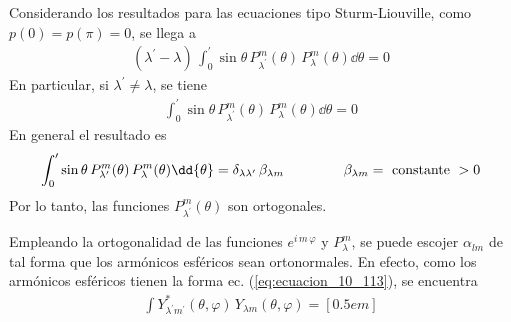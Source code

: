 Considerando los resultados para las ecuaciones tipo Sturm-Liouville, como $p(0) = p(\pi) = 0$, se llega a
\begin{align*}
(\lambda^{\prime} - \lambda) \, \int_{0}^{\prime} \sin \theta \, P_{\lambda^{\prime}}^{m} (\theta) \, P_{\lambda}^{m} (\theta) \dd{\theta} = 0
\end{align*}
En particular, si $\lambda^{\prime} \neq \lambda$, se tiene
\begin{align}
\int_{0}^{\prime} \sin \theta \, P_{\lambda^{\prime}}^{m} (\theta) \, P_{\lambda}^{m} (\theta) \dd{\theta} = 0
\label{eq:ecuacion_10_123}
\end{align}
En general el resultado es
\begin{align}
\int_{0}^{\prime} \sin \theta \, P_{\lambda^{\prime}}^{m} (\theta) \, P_{\lambda}^{m} (\theta) \dd{\theta} = \delta_{\lambda \lambda^{\prime}} \, \beta_{\lambda m} \hspace{1.5cm} \beta_{\lambda m} = \mbox{ constante } > 0
\label{eq:ecuacion_10_124}
\end{align}
Por lo tanto, las funciones $P_{\lambda^{\prime}}^{m} (\theta)$ son ortogonales.
\par
Empleando la ortogonalidad de las funciones $e^{i \, m \, \varphi}$ y $P_{\lambda}^{m}$, se puede escojer $\alpha_{l m}$ de tal forma que los armónicos esféricos sean ortonormales. En efecto, como los armónicos esféricos tienen la forma ec. (\ref{eq:ecuacion_10_113}), se encuentra
\begin{align}
\int Y_{\lambda^\prime m^{\prime}}^{*} (\theta, \varphi) \, Y_{\lambda m} (\theta, \varphi) = \nonumber [0.5em]
\label{eq:ecuacion_10_125}
\end{align}
